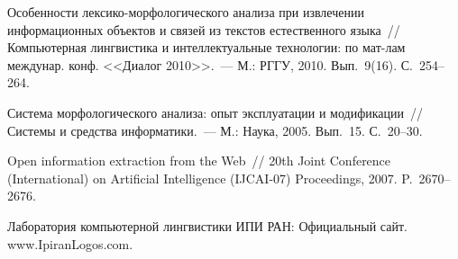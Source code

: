\begin{multicols}{2}
{{\begin{thebibliography}{99}
Особенности лек\-си\-ко-мор\-фо\-ло\-ги\-че\-ско\-го анализа при извлечении 
информационных объектов и связей из текстов естественного языка~// 
Компьютерная лингвистика и интеллектуаль\-ные технологии:  по 
мат-лам междунар. конф. <<Диалог 2010>>.~--- М.: РГГУ, 2010. Вып.~9(16). С.~254--264.

Система морфологического анализа: опыт эксплуатации и модификации~// 
Системы и средства информатики.~--- М.: Наука, 2005. Вып.~15. С.~20--30.

\label{end\stat}

Open information extraction from the Web~// 20th Joint Conference (International) 
on Artificial Intelligence (IJCAI-07) Proceedings, 2007. P.~2670--2676.



Лаборатория компьютерной лингвистики ИПИ РАН: Официальный сайт. {\sf 
www.IpiranLogos.com}.
 \end{thebibliography}
}
}


\end{multicols}